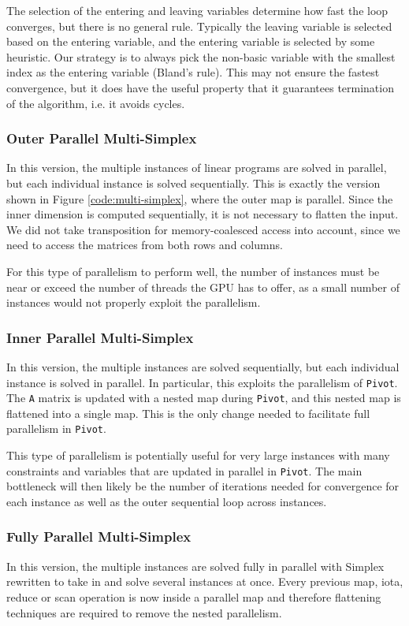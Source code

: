 The selection of the entering and leaving variables determine how fast the loop converges, but there is no general rule. Typically the leaving variable is selected based on the entering variable, and the entering variable is selected by some heuristic. Our strategy is to always pick the non-basic variable with the smallest index as the entering variable (Bland's rule). This may not ensure the fastest convergence, but it does have the useful property that it guarantees termination of the algorithm, i.e. it avoids cycles.

\subsubsection{Outer Parallel Multi-Simplex}
In this version, the multiple instances of linear programs are solved in parallel, but each individual instance is solved sequentially. This is exactly the version shown in Figure \ref{code:multi-simplex}, where the outer map is parallel. Since the inner dimension is computed sequentially, it is not necessary to flatten the input. We did not take transposition for memory-coalesced access into account, since we need to access the matrices from both rows and columns.

For this type of parallelism to perform well, the number of instances must be near or exceed the number of threads the GPU has to offer, as a small number of instances would not properly exploit the parallelism.

\subsubsection{Inner Parallel Multi-Simplex}
In this version, the multiple instances are solved sequentially, but each individual instance is solved in parallel. In particular, this exploits the parallelism of \texttt{Pivot}. The \texttt{A} matrix is updated with a nested map during \texttt{Pivot}, and this nested map is flattened into a single map. This is the only change needed to facilitate full parallelism in \texttt{Pivot}.

This type of parallelism is potentially useful for very large instances with many constraints and variables that are updated in parallel in \texttt{Pivot}. The main bottleneck will then likely be the number of iterations needed for convergence for each instance as well as the outer sequential loop across instances.

\subsubsection{Fully Parallel Multi-Simplex}
In this version, the multiple instances are solved fully in parallel with Simplex rewritten to take in and solve several instances at once. Every previous map, iota, reduce or scan operation is now inside a parallel map and therefore flattening techniques are required to remove the nested parallelism.


